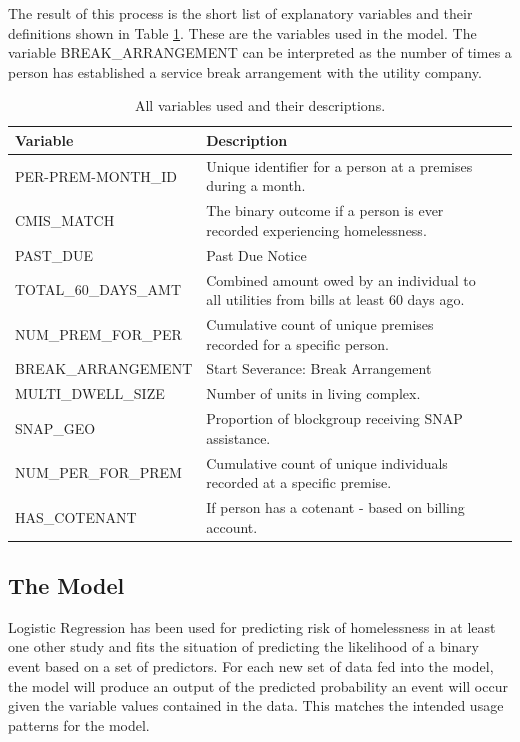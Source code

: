 \documentclass[utf8]{frontiersFPHY} %
\begin{document}
The result of this process is the short list of explanatory variables and their definitions shown in Table \ref{tbl:varsUsed}. These are the variables used in the model. The variable BREAK\_ARRANGEMENT can be interpreted as the number of times a person has established a service break arrangement with the utility company.

\begin{table}[h]
    \centering
    \begin{tabular}{l p{10cm} l p{16cm}}
        \toprule
        Variable &                  Description \\
        \midrule
        PER-PREM-MONTH\_ID & Unique identifier for a person at a premises during a month. \\
        CMIS\_MATCH & The binary outcome if a person is ever recorded experiencing homelessness. \\
        PAST\_DUE & Past Due Notice \\
        TOTAL\_60\_DAYS\_AMT & Combined amount owed by an individual to all utilities from bills at least 60 days ago. \\
        NUM\_PREM\_FOR\_PER & Cumulative count of unique premises recorded for a specific person. \\
        BREAK\_ARRANGEMENT & Start Severance: Break Arrangement \\
        MULTI\_DWELL\_SIZE & Number of units in living complex. \\
        SNAP\_GEO & Proportion of blockgroup receiving SNAP assistance. \\
        NUM\_PER\_FOR\_PREM & Cumulative count of unique individuals recorded at a specific premise. \\
        HAS\_COTENANT & If person has a cotenant - based on billing account. \\
        \midrule
    \end{tabular}
    \caption[Variables Used]{All variables used and their descriptions.}
    \label{tbl:varsUsed}
\end{table}

\subsection{The Model}
Logistic Regression has been used for predicting risk of homelessness in at least one other study \cite{van2009longitudinal} and fits the situation of predicting the likelihood of a binary event based on a set of predictors. For each new set of data fed into the model, the model will produce an output of the predicted probability an event will occur given the variable values contained in the data. This matches the intended usage patterns for the model. 
\end{document}
